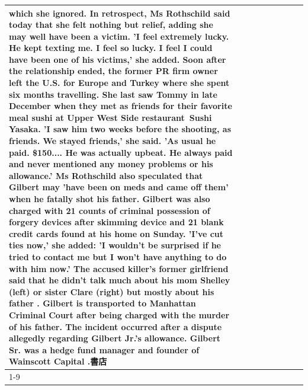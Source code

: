 \begin{table}[H]
\begin{tabular}{lllrlllll}
which she ignored. In retrospect, Ms Rothschild said today that she felt nothing but relief, adding she may well have been a victim. 'I feel extremely lucky. He kept texting me. I feel so lucky. I feel I could have been one of his victims,' she added. Soon after the relationship ended, the former PR firm owner left the U.S. for Europe and Turkey where she spent six months  travelling. She last saw Tommy in late December when they met as friends for their favorite meal sushi at Upper West Side restaurant Sushi Yasaka. 'I saw him two weeks before the shooting, as friends. We stayed friends,' she said. 'As usual he paid. \$150.... He was actually upbeat. He always paid and never mentioned any money problems or his allowance.' Ms Rothschild also speculated that Gilbert may 'have been on meds and came off them' when he fatally shot his father. Gilbert was also charged with 21 counts of criminal possession of forgery devices after skimming device and 21 blank credit cards found at his home on Sunday. 'I've cut ties now,' she added: 'I wouldn’t be surprised if he tried to contact me but I won’t have anything to do with him now.' The accused killer's former girlfriend said that he didn't talk much about his mom Shelley (left) or sister Clare (right) but mostly about his father . Gilbert is transported to Manhattan Criminal Court  after being charged with the murder of his father. The incident occurred after a dispute allegedly regarding Gilbert Jr.'s allowance. Gilbert Sr. was a hedge fund manager and founder of Wainscott Capital .書店 \\
\cline{1-9} \cline{2-9}

\end{tabular}
\end{table}
